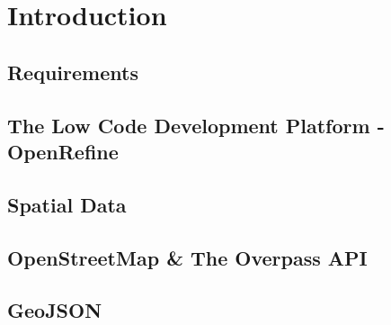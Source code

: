 \chapter{Introduction}
\section{Requirements}
\lipsum[1-3]
\section{The Low Code Development Platform - OpenRefine}
\lipsum[8-10]
\section{Spatial Data}
\lipsum[11-13]
\section{OpenStreetMap \& The Overpass API}
\lipsum[5-6]
\section{GeoJSON}
\lipsum[7-9]
